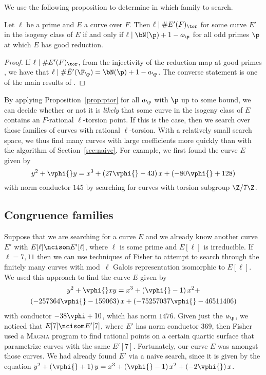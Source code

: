 \documentclass{amsart}
\begin{document}
We use the following proposition to determine in which family to
search.
\begin{proposition}\label{prop:ptor}
Let $\ell$ be a prime and $E$ a curve over $F$.
Then $\ell \mid \# E'(F)_{\tor}$ for some curve $E'$ in the isogeny class
of $E$ if and only if $\ell \mid \bN(\p)+1 - a_{\p}$ for all
odd primes $\p$ at which $E$ has good reduction.
\end{proposition}
\begin{proof}
If $\ell  \mid \# E'(F)_{\tor}$, from the injectivity of the
reduction map at good primes \cite[Appendix]{katz:torsion}, we have that
$\ell \mid \#\tilde E'(\F_\p) = \bN(\p)+1 - a_{\p}$. The converse statement
is one of the main results of \cite{katz:torsion}.
\end{proof}

By applying Proposition~\ref{prop:ptor} for all $a_{\p}$ with $\p$ up
to some bound, we can decide whether or not it is {\em likely} that
some curve in the isogeny class of $E$ contains an $F$-rational
$\ell$-torsion point. If this is the case, then we search over those
families of curves with rational $\ell$-torsion. With a relatively small
search space, we thus find many curves with large coefficients more
quickly than with the algorithm of Section~\ref{sec:naive}.
For example, we first found the curve $E$ given by 
$$y^2 + \vphi{}y = x^3 + \left(27 \vphi{} - 43\right)x + \left(-80 \vphi{} + 128\right) 
$$ with norm conductor $145$ by searching for curves with torsion subgroup $\Z/7\Z$.


\subsection{Congruence families}\label{sec:congfam}
Suppose that we are searching for a curve $E$ and we already know
another curve $E'$ with $E[\ell] \ncisom E'[\ell]$, where $\ell$ is
some prime and $E[\ell]$ is irreducible.  If $\ell=7,11$ then we can use
techniques of Fisher \cite{fisher:families_cong} to attempt to search
through the finitely many curves with mod~$\ell$ Galois representation
isomorphic to $E[\ell]$.
We used this approach to find the curve $E$ given by
\begin{multline}\label{equation:fisher-curve}
y^2 + \vphi{}xy =  x^3 + \left(\vphi{} - 1\right)x^2 + \\ \left(-257364 \vphi{} - 159063\right)x + \left(-75257037 \vphi{} - 46511406\right)
\end{multline}
with conductor $-38 \vphi + 10$, which has norm $1476$.  Given just the $a_{\p}$, we noticed that
$E[7] \ncisom E'[7]$, where $E'$ has norm conductor 369, then Fisher
used a \textsc{Magma} \cite{magma} program to find rational points on a certain
quartic surface that parametrize curves with the same $E'[7]$.
Fortunately, our curve $E$ was amongst those curves.
We had already found $E'$ via a naive search, since it is given
by the equation $y^2 + \left(\vphi{} + 1\right)y = x^3 + \left(\vphi{} - 1\right)x^2 + \left(-2 \vphi{}\right)x$.
\end{document}
